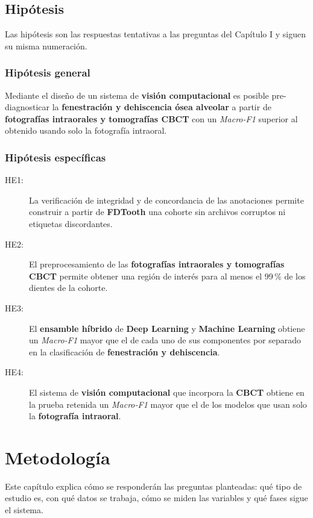 \documentclass[12pt,a4paper]{article}
\newcommand{\prob}[1]{\textcolor{problema}{\textbf{#1}}}
\newcommand{\sol}[1]{\textcolor{solucion}{\textbf{#1}}}
\newcommand{\dat}[1]{\textcolor{dataset}{\textbf{#1}}}
\newcommand{\prob}[1]{#1}
\newcommand{\sol}[1]{#1}
\newcommand{\dat}[1]{#1}
\begin{document}
\subsection{Hipótesis}
Las hipótesis son las respuestas tentativas a las preguntas del
Capítulo I y siguen su misma numeración.

\subsubsection{Hipótesis general}
Mediante el diseño de un sistema de \sol{visión computacional} es posible
pre-diagnosticar la \prob{fenestración y dehiscencia ósea alveolar} a
partir de \dat{fotografías intraorales y tomografías CBCT} con un
\textit{Macro-F1} superior al obtenido usando solo la fotografía
intraoral.

\subsubsection{Hipótesis específicas}
\begin{description}
  \item[HE1:] La verificación de integridad y de concordancia de las
  anotaciones permite construir a partir de \dat{FDTooth} una cohorte sin
  archivos corruptos ni etiquetas discordantes.
  \item[HE2:] El preprocesamiento de las \dat{fotografías intraorales y
  tomografías CBCT} permite obtener una región de interés para al menos
  el 99\,\% de los dientes de la cohorte.
  \item[HE3:] El \sol{ensamble híbrido} de \sol{Deep Learning} y
  \sol{Machine Learning} obtiene un \textit{Macro-F1} mayor que el de cada
  uno de sus componentes por separado en la clasificación de
  \prob{fenestración y dehiscencia}.
  \item[HE4:] El sistema de \sol{visión computacional} que incorpora la
  \dat{CBCT} obtiene en la prueba retenida un \textit{Macro-F1} mayor que
  el de los modelos que usan solo la \dat{fotografía intraoral}.
\end{description}

\section{Metodología}
Este capítulo explica cómo se responderán las preguntas planteadas: qué
tipo de estudio es, con qué datos se trabaja, cómo se miden las variables
y qué fases sigue el sistema.
\end{document}
